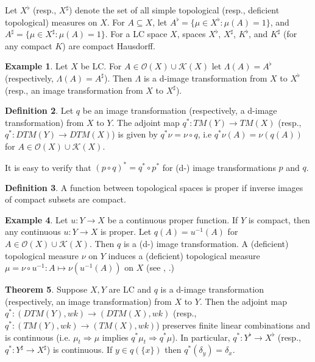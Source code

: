 \documentclass[sn-mathphys-num]{sn-jnl}%
\theoremstyle{thmstyleone}%
\theoremstyle{definition}
\newtheorem{theorem}{Theorem}%
\newtheorem{definition}[theorem]{Definition}
\newtheorem{example}[theorem]{Example}
\begin{document}
\noindent
Let  $X^{\flat}$ (resp.,  $X^\sharp$) denote the set of all simple topological (resp., deficient topological) measures on $X$. 
For $ A \subseteq X$, let $A^\flat = \{ \mu \in X^{\flat}: \mu(A) = 1\}$, and $A^\sharp = \{ \mu \in X^{\sharp}: \mu(A) = 1\}$. 
For a LC space $X$, spaces $X^{\flat}$,  $X^\sharp$, $K^\flat$, and $K^\sharp$ (for any compact $K$) 
are compact Hausdorff. 

\begin{example} \label{staIT}
Let $X$ be LC. For $A \in \mathscr{O}(X) \cup \mathscr{K}(X)$ let $\Lambda(A) = A^{\flat}$ (respectively,  $\Lambda(A) = A^\sharp$).
Then  $\Lambda$ is a d-image transformation from $X$ to $X^{\flat}$ (resp., an image transformation from $X$ to $X^\sharp$). 
\end{example}

\begin{definition}  \label{q*}
Let $q$ be an image transformation (respectively, a d-image transformation)  from $X$ to $Y$. The adjoint map $q^* : TM(Y) \rightarrow TM(X)$
(resp.,   $q^* : DTM(Y) \rightarrow DTM(X)$)  is given by $q^*\nu = \nu \circ q$, i.e $q^*\nu(A) = \nu(q(A))$ for $ A \in \mathscr{O}(X) \cup \mathscr{K}(X)$.
\end{definition}

\noindent
It is easy to verify that $(p \circ q)^* = q^* \circ p^*$ for (d-) image transformations $p$ and $q$.

\begin{definition}
A function between topological spaces is proper if inverse images of compact subsets are compact.
\end{definition}

\begin{example}  \label{invfunIT}
Let $u :Y  \longrightarrow X$ be a continuous proper function.  
If $Y$ is compact, then any continuous $u :Y  \longrightarrow X$ is proper.    
Let $q(A) = u^{-1}(A)$ for $A \in \mathscr{O}(X) \cup \mathscr{K}(X)$. 
Then $q$ is a (d-) image transformation.
A (deficient) topological measure $ \nu$ on $Y$ 
induces a (deficient) topological measure $\mu = \nu \circ u^{-1}: A \mapsto \nu(u^{-1}(A))$ on $X$ (see 
\cite[Pr. 5.1]{Butler:DTMLC},  \cite[Ex. 14]{AarnesJohansenRustad}.)
\end{example}

\begin{theorem} \label{adjCont}
Suppose $X,Y$ are LC and $q$ is a d-image transformation (respectively, an image transformation) from $X$ to $Y$.
Then the adjoint map $q^* : (DTM(Y), wk) \rightarrow (DTM(X), wk) $ (resp.,  $q^* : (TM(Y), wk) \rightarrow (TM(X), wk) $) 
preserves finite linear combinations and  
is continuous (i.e. $ \mu_t \Longrightarrow \mu$ implies $q^* \mu_t \Longrightarrow  q^*\mu$).
In particular,  $q^* :Y^{\flat} \rightarrow X^{\flat}$ (resp.,  $q^* :Y^\sharp \rightarrow X^\sharp$)  is continuous.
If $y \in q(\{ x\})$ then $q^*(\delta_y) = \delta_x$.
\end{theorem}
\end{document}
